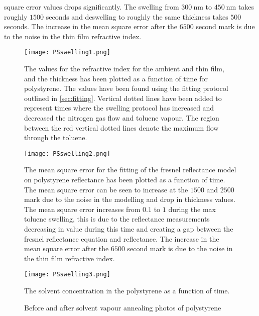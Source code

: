 \documentclass[MasterThesisMain.tex]{subfiles}
\begin{document}
square error values drops significantly. The swelling from $\SI{300}{\nano\meter}$ to $\SI{450}{\nano\meter}$ takes roughly $1500$ seconds and deswelling to roughly the same thickness takes $500$ seconds. The increase in the mean square error after the $6500$ second mark is due to the noise in the thin film refractive index.       

\begin{figure}
\centering
\texttt{[image: PSswelling1.png]}
\caption{The values for the refractive index for the ambient and thin film, and the thickness has been plotted as a function of time for polystyrene. The values have been found using the fitting protocol outlined in \ref{sec:fitting}. Vertical dotted lines have been added to represent times where the swelling protocol has increased and decreased the nitrogen gas flow and toluene vapour. The region between the red vertical dotted lines denote the maximum flow through the toluene.}
\label{fig:PSswelling1}
\end{figure}


\begin{figure}
\centering
\texttt{[image: PSswelling2.png]}
\caption{The mean square error for the fitting of the fresnel reflectance model on polystyrene reflectance has been plotted as a function of time. The mean square error can be seen to increase at the $1500$ and $2500$ mark due to the noise in the modelling and drop in thickness values. The mean square error increases from $0.1$ to $1$ during the max toluene swelling, this is due to the reflectance measurements decreasing in value during this time and creating a gap between the fresnel reflectance equation and reflectance. The increase in the mean square error after the $6500$ second mark is due to the noise in the thin film refractive index.}
\label{fig:PSswelling2}
\end{figure}

\begin{figure}
\centering
\texttt{[image: PSswelling3.png]}
\caption{The solvent concentration in the polystyrene as a function of time.}
\label{fig:PSswelling3}
\end{figure}

\begin{figure}
\centering     
{}
\caption{Before and after solvent vapour annealing photos of polystyrene}
\end{figure}
	
\end{document}
